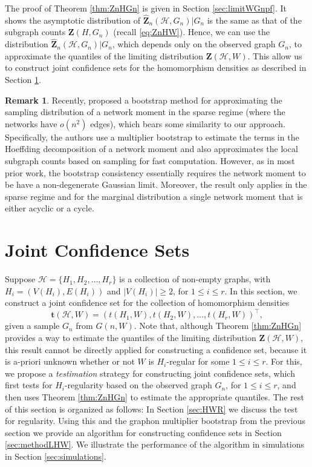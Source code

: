 \documentclass[11pt,reqno]{amsart}
\numberwithin{equation}{section}
\newcommand{\cH}{{\mathcal H}}
\theoremstyle{definition}
\newtheorem{remark}{Remark}[section]
\begin{document}
The proof of Theorem \ref{thm:ZnHGn} is given in Section \ref{sec:limitWGnpf}. It shows the asymptotic distribution of $\hat{\bm Z}_n(\mathcal H, G_n)|G_n$ is the same as that of the subgraph counts $\bm{Z}(H, G_n)$ (recall \eqref{eq:ZnHW}). Hence, we can use the distribution $\hat{\bm Z}_n(\mathcal H, G_n)|G_n$, which depends only on the observed graph $G_n$, to approximate the quantiles of the limiting distribution $\bm{Z}(\mathcal{H},W)$. This allow us to construct joint confidence sets for the homomorphism densities as described in Section \ref{sec:LHW}.  


\begin{remark} 
Recently, \citet{lin2020bootstrap} proposed a bootstrap method for approximating the sampling distribution of a network moment in the sparse regime (where the networks have $o(n^2)$ edges), which bears some similarity to our approach. Specifically, the authors use a multiplier bootstrap to estimate the terms in the Hoeffding decomposition of a network moment and also approximates the local subgraph counts based on sampling for fast computation. However, as in most prior work, the bootstrap consistency essentially requires the network moment to be have a non-degenerate Gaussian limit. Moreover, the result only applies in the sparse regime and for the marginal distribution a single network moment that is either acyclic or a cycle. 
\end{remark}


\section{Joint Confidence Sets} 
\label{sec:LHW}
Suppose $\mathcal H = \{ H_1, H_2, \ldots, H_r \}$ is a collection of non-empty graphs, with $H_i= (V(H_i), E(H_i))$ and $|V(H_{i})|\geq 2$, for $1 \leq i \leq r$. In this section, we construct a joint confidence set for the collection of homomorphism densities 
$$\bm t(\cH, W) = (t(H_1, W), t(H_2, W), \ldots, t(H_r, W))^\top, $$ 
given a sample $G_n$ from $G(n, W)$. Note that, although Theorem \ref{thm:ZnHGn} provides a way to estimate the quantiles of the limiting distribution $\bm Z(\cH, W)$, this result cannot be directly applied for constructing a confidence set, because it is a-priori unknown whether or not $W$ is $H_i$-regular for some $1 \leq i \leq r$. For this, we propose a {\it testimation} strategy for constructing joint confidence sets, which first tests for $H_i$-regularity based on the observed graph $G_n$, for $1 \leq i \leq r$, and then uses Theorem \ref{thm:ZnHGn} to estimate the appropriate quantiles. The rest of this section is organized as follows: In Section \ref{sec:HWR} we discuss the test for regularity. Using this and the graphon multiplier bootstrap from the previous section we provide an algorithm for constructing confidence sets in Section \ref{sec:methodLHW}. We illustrate the performance of the algorithm in simulations in Section \ref{sec:simulations}. 
\end{document}
